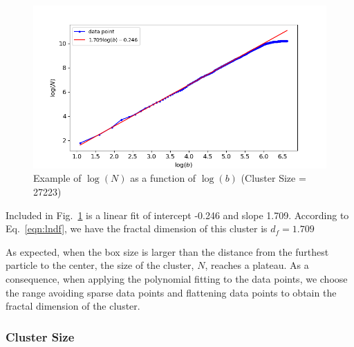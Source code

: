 \documentclass[aps,preprint,groupedaddress,letterpaper]{revtex4-1}
\begin{document}
\begin{figure}[h]
\centering
\includegraphics[width=5.0in]{img/dfplot.png}
\caption{Example of $\log(N)$ as a function of $\log(b)$ (Cluster Size = 27223)
\label{dfplot}}
\end{figure}

Included in Fig.~\ref{dfplot} is a linear fit of intercept -0.246 and slope 1.709. According to Eq.~\ref{eqn:lndf}, we have the fractal dimension of this cluster is $d_f = 1.709$

As expected, when the box size is larger than the distance from the furthest particle to the center, the size of the cluster, $N$, reaches a plateau. As a consequence, when applying the polynomial fitting to the data points, we choose the range avoiding sparse data points and flattening data points to obtain the fractal dimension of the cluster. 

\subsubsection{Cluster Size}


\end{document}
